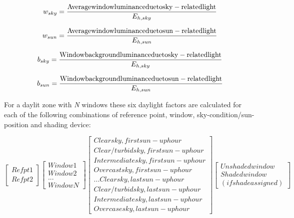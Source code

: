 \begin{equation}
{w_{sky}} = \frac{{{\rm{Average window luminance due to sky - related light}}}}{{{E_{h,sky}}}}
\end{equation}

\begin{equation}
{w_{sun}} = \frac{{{\rm{Average window luminance due to sun - related light}}}}{{{E_{h,sun}}}}
\end{equation}

\begin{equation}
{b_{sky}} = \frac{{{\rm{Window background luminance due to sky - related light}}}}{{{E_{h,sky}}}}
\end{equation}

\begin{equation}
{b_{sun}} = \frac{{{\rm{Window background luminance due to sun - related light}}}}{{{E_{h,sun}}}}
\end{equation}

For a daylit zone with \emph{N} windows these six daylight factors are calculated for each of the following combinations of reference point, window, sky-condition/sun-position and shading device:

\begin{equation}
\left[
    \begin{array}{c}
      Ref pt 1 \\
      Ref pt 2
    \end{array}
  \right]
  \left[
    \begin{array}{c}
      Window 1 \\
      Window 2 \\
      ... \\
      Window N
    \end{array}
  \right]
  \left[
    \begin{array}{c}
      Clear sky, first sun-up hour \\
      Clear/turbid sky, first sun-up hour \\
      Intermediate sky, first sun-up hour \\
      Overcast sky, first sun-up hour \\
      ...
      Clear sky, last sun-up hour \\
      Clear/turbid sky, last sun-up hour \\
      Intermediate sky, last sun-up hour \\
      Overcase sky, last sun-up hour
    \end{array}
   \right]
   \left[
     \begin{array}{c}
       Unshaded window \\
       Shaded window \\
       (if shade assigned)
     \end{array}
   \right]
\end{equation}

